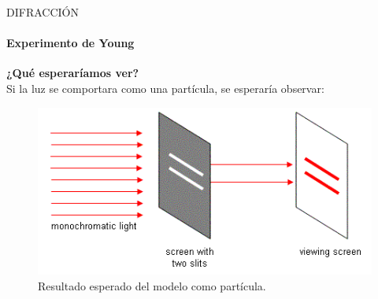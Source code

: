 \begin{frame}{DIFRACCIÓN}
    \framesubtitle{Experimento de Young}
    \textbf{¿Qué esperaríamos ver?\\}
	Si la luz se comportara como una partícula, se esperaría observar:
	 \begin{figure}
         \includegraphics[scale=0.7]{juanse/young_particle.png}
         \caption{Resultado esperado del modelo como partícula\footnotemark{}.}
     \end{figure}
\end{frame}

